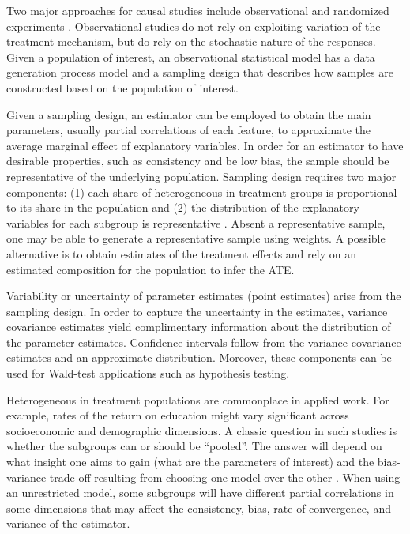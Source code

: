 \documentclass{jbsc}
\begin{document}
Two major approaches for causal studies include observational and randomized experiments \citep{Athey_Imbens_2016}. Observational studies do not rely on exploiting variation of the treatment mechanism, but do rely on the stochastic nature of the responses. Given a population of interest, an observational statistical model has a data generation process model and a sampling design that describes how samples are constructed based on the population of interest.

Given a sampling design, an estimator can be employed to obtain the main parameters, usually partial correlations of each feature, to approximate the average marginal effect of explanatory variables. In order for an estimator to have desirable properties, such as consistency and be low bias, the sample should be representative of the underlying population. Sampling design requires two major components: (1) each share of heterogeneous in treatment groups is proportional to its share in the population and (2) the distribution of the explanatory variables for each subgroup is representative \citep{Solon_Haider_Wooldridge_2015}. Absent a representative sample, one may be able to generate a representative sample using weights. A possible alternative is to obtain estimates of the treatment effects and rely on an estimated composition for the population to infer the ATE.

Variability or uncertainty of parameter estimates (point estimates) arise from the sampling design. In order to capture the uncertainty in the estimates, variance covariance estimates yield complimentary information about the distribution of the parameter estimates. Confidence intervals follow from the variance covariance estimates and an approximate distribution. Moreover, these components can be used for Wald-test applications such as hypothesis testing.

Heterogeneous in treatment populations are commonplace in applied work. For example, rates of the return on education might vary significant across socioeconomic and demographic dimensions. A classic question in such studies is whether the subgroups can or should be ``pooled''. The answer will depend on what insight one aims to gain (what are the parameters of interest) and the bias-variance trade-off resulting from choosing one model over the other \citep{Baltagi_2013}. When using an unrestricted model, some subgroups will have different partial correlations in some dimensions that may affect the consistency, bias, rate of convergence, and variance of the estimator.
\end{document}
